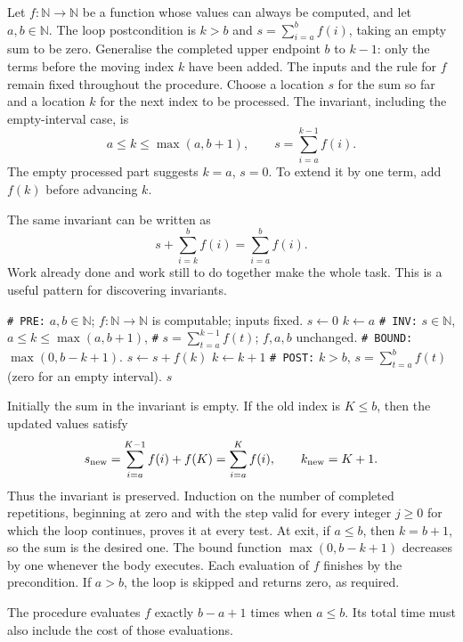 Let $f:\mathbb N\to\mathbb N$ be a function whose values can always be computed, and let $a,b\in\mathbb N$.
The loop postcondition is $k>b$ and $s=\sum_{i=a}^{b}f(i)$,
taking an empty sum to be zero. Generalise the completed upper endpoint
$b$ to $k-1$: only the terms before the moving index $k$ have been added.
The inputs and the rule for $f$ remain fixed throughout the procedure.
Choose a location $s$ for the sum so far and a location $k$ for the next
index to be processed. The invariant, including the empty-interval case, is
\[
a\leq k\leq\max(a,b+1),\qquad s=\sum_{i=a}^{k-1}f(i).
\]
The empty processed part suggests $k=a$, $s=0$. To extend it by one term,
add $f(k)$ before advancing $k$.

The same invariant can be written as
\[
s+\sum_{i=k}^{b}f(i)=\sum_{i=a}^{b}f(i).
\]
Work already done and work still to do together make the whole task.
This is a useful pattern for discovering invariants.

\begin{algorithm}[H]
\begin{algorithmic}[1]
\Statex \texttt{\# PRE:} $a,b\in\mathbb N$; $f:\mathbb N\to\mathbb N$ is computable; inputs fixed.
\State $s\leftarrow0$
\State $k\leftarrow a$
\Statex \texttt{\# INV:} $s\in\mathbb N$, $a\leq k\leq\max(a,b+1)$,
\Statex \texttt{\#} $s=\sum_{t=a}^{k-1}f(t)$; $f,a,b$ unchanged.
\Statex \texttt{\# BOUND:} $\max(0,b-k+1)$.
\State $s\leftarrow s+f(k)$
\State $k\leftarrow k+1$
\EndWhile
\Statex \texttt{\# POST:} $k>b$, $s=\sum_{t=a}^{b}f(t)$ (zero for an empty interval).
\State \Return $s$
\EndProcedure
\end{algorithmic}
\caption{Accumulate the sum of successive function values.}
\end{algorithm}

Initially the sum in the invariant is empty. If the old index is $K\leq b$,
then the updated values satisfy
\[
s_{\rm new}=\sum_{i=a}^{K-1}f(i)+f(K)=\sum_{i=a}^{K}f(i),
\qquad k_{\rm new}=K+1.
\]
Thus the invariant is preserved. Induction on the number of completed
repetitions, beginning at zero and with the step valid for every integer
$j\geq0$ for which the loop continues, proves it at every test. At exit, if $a\leq b$, then $k=b+1$, so the sum is the desired one.
The bound function $\max(0,b-k+1)$ decreases by one whenever the body
executes. Each evaluation of $f$ finishes by the precondition. If $a>b$,
the loop is skipped and returns zero, as required.

The procedure evaluates $f$ exactly $b-a+1$ times when $a\leq b$.
Its total time must also include the cost of those evaluations.

